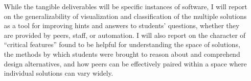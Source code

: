 \documentclass[12pt]{article}
\begin{document}



While the tangible deliverables will be specific instances of software, I will report on the generalizability of visualization and classification of the multiple solutions as a tool for improving hints and answers to students' questions, whether they are provided by peers, staff, or automation. I will also report on the character of ``critical features'' found to be helpful for understanding the space of solutions, the methods by which students were brought to reason about and comprehend design alternatives, and how peers can be effectively paired within a space where individual solutions can vary widely.

%
%
%
%

\end{document}
